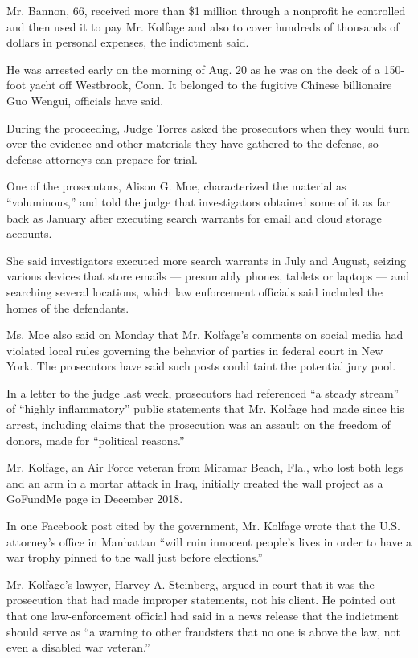 Mr. Bannon, 66, received more than \$1 million through a nonprofit he
controlled and then used it to pay Mr. Kolfage and also to cover
hundreds of thousands of dollars in personal expenses, the indictment
said.

He was arrested early on the morning of Aug. 20 as he was on the deck of
a 150-foot yacht off Westbrook, Conn. It belonged to the fugitive
Chinese billionaire Guo Wengui, officials have said.

During the proceeding, Judge Torres asked the prosecutors when they
would turn over the evidence and other materials they have gathered to
the defense, so defense attorneys can prepare for trial.

One of the prosecutors, Alison G. Moe, characterized the material as
``voluminous,'' and told the judge that investigators obtained some of
it as far back as January after executing search warrants for email and
cloud storage accounts.

She said investigators executed more search warrants in July and August,
seizing various devices that store emails --- presumably phones, tablets
or laptops --- and searching several locations, which law enforcement
officials said included the homes of the defendants.

Ms. Moe also said on Monday that Mr. Kolfage's comments on social media
had violated local rules governing the behavior of parties in federal
court in New York. The prosecutors have said such posts could taint the
potential jury pool.

In a letter to the judge last week, prosecutors had referenced ``a
steady stream'' of ``highly inflammatory'' public statements that Mr.
Kolfage had made since his arrest, including claims that the prosecution
was an assault on the freedom of donors, made for ``political reasons.''

Mr. Kolfage, an Air Force veteran from Miramar Beach, Fla., who lost
both legs and an arm in a mortar attack in Iraq, initially created the
wall project as a GoFundMe page in December 2018.

In one Facebook post cited by the government, Mr. Kolfage wrote that the
U.S. attorney's office in Manhattan ``will ruin innocent people's lives
in order to have a war trophy pinned to the wall just before
elections.''

Mr. Kolfage's lawyer, Harvey A. Steinberg, argued in court that it was
the prosecution that had made improper statements, not his client. He
pointed out that one law-enforcement official had said in a news release
that the indictment should serve as ``a warning to other fraudsters that
no one is above the law, not even a disabled war veteran.''

